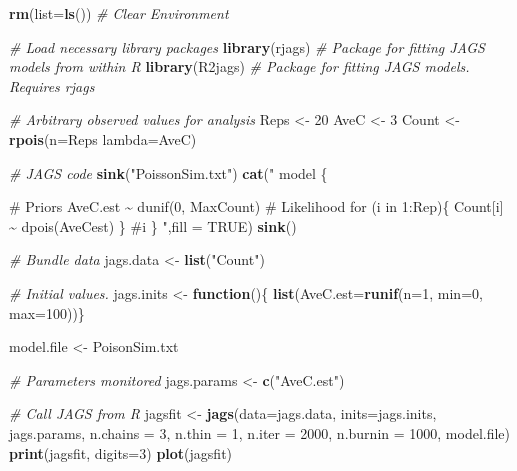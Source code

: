 \documentclass[
]{krantz}
\makeatletter
\newenvironment{Shaded}{\begin{snugshade}}{\end{snugshade}}
\newcommand{\AttributeTok}[1]{\textcolor[rgb]{0.27,0.27,0.27}{#1}}
\newcommand{\CommentTok}[1]{\textcolor[rgb]{0.37,0.37,0.37}{\textit{#1}}}
\newcommand{\ConstantTok}[1]{\textcolor[rgb]{0.37,0.37,0.37}{#1}}
\newcommand{\ControlFlowTok}[1]{\textcolor[rgb]{0.27,0.27,0.27}{\textbf{#1}}}
\newcommand{\DecValTok}[1]{\textcolor[rgb]{0.06,0.06,0.06}{#1}}
\newcommand{\FunctionTok}[1]{\textcolor[rgb]{0.27,0.27,0.27}{\textbf{#1}}}
\newcommand{\NormalTok}[1]{#1}
\newcommand{\OtherTok}[1]{\textcolor[rgb]{0.37,0.37,0.37}{#1}}
\newcommand{\StringTok}[1]{\textcolor[rgb]{0.5,0.5,0.5}{#1}}
\newenvironment{kframe}{%
\medskip{}
\setlength{\fboxsep}{.8em}
 \def\at@end@of@kframe{}%
 \ifinner\ifhmode%
  \def\at@end@of@kframe{\end{minipage}}%
  \begin{minipage}{\columnwidth}%
 \fi\fi%
 \def\FrameCommand##1{\hskip\@totalleftmargin \hskip-\fboxsep
 \colorbox{shadecolor}{##1}\hskip-\fboxsep
     \hskip-\linewidth \hskip-\@totalleftmargin \hskip\columnwidth}%
 \MakeFramed {\advance\hsize-\width
   \@totalleftmargin\z@ \linewidth\hsize
   \@setminipage}}%
 {\par\unskip\endMakeFramed%
 \at@end@of@kframe}
\renewenvironment{Shaded}{\begin{kframe}}{\end{kframe}}
\makeatother
\begin{document}
\begin{Shaded}
\begin{Highlighting}[]
\FunctionTok{rm}\NormalTok{(}\AttributeTok{list=}\FunctionTok{ls}\NormalTok{()) }\CommentTok{\# Clear Environment}

\CommentTok{\# Load necessary library packages}
\FunctionTok{library}\NormalTok{(rjags)   }\CommentTok{\# Package for fitting JAGS models from within R}
\FunctionTok{library}\NormalTok{(R2jags)  }\CommentTok{\# Package for fitting JAGS models. Requires rjags}

\CommentTok{\# Arbitrary \textquotesingle{}observed\textquotesingle{} values for analysis}
\NormalTok{Reps }\OtherTok{\textless{}{-}} \DecValTok{20}
\NormalTok{AveC }\OtherTok{\textless{}{-}} \DecValTok{3}
\NormalTok{Count }\OtherTok{\textless{}{-}} \FunctionTok{rpois}\NormalTok{(}\AttributeTok{n=}\NormalTok{Reps }\AttributeTok{lambda=}\NormalTok{AveC)}

\CommentTok{\# JAGS code}
\FunctionTok{sink}\NormalTok{(}\StringTok{"PoissonSim.txt"}\NormalTok{)}
\FunctionTok{cat}\NormalTok{(}\StringTok{"}
\StringTok{    model \{}

\StringTok{    \# Priors}
\StringTok{    AveC.est \textasciitilde{} dunif(0, MaxCount)}
\StringTok{   }
\StringTok{    \# Likelihood}
\StringTok{    for (i in 1:Rep)\{}
\StringTok{    Count[i] \textasciitilde{} dpois(AveCest)}
\StringTok{    \} \#i}
\StringTok{\}}
\StringTok{    "}\NormalTok{,}\AttributeTok{fill =} \ConstantTok{TRUE}\NormalTok{)}
\FunctionTok{sink}\NormalTok{()}

\CommentTok{\# Bundle data}
\NormalTok{jags.data }\OtherTok{\textless{}{-}} \FunctionTok{list}\NormalTok{(}\StringTok{"Count"}\NormalTok{)}

\CommentTok{\# Initial values.}
\NormalTok{jags.inits }\OtherTok{\textless{}{-}} \ControlFlowTok{function}\NormalTok{()\{ }\FunctionTok{list}\NormalTok{(}\AttributeTok{AveC.est=}\FunctionTok{runif}\NormalTok{(}\AttributeTok{n=}\DecValTok{1}\NormalTok{, }\AttributeTok{min=}\DecValTok{0}\NormalTok{, }\AttributeTok{max=}\DecValTok{100}\NormalTok{))\}}

\NormalTok{model.file }\OtherTok{\textless{}{-}} \StringTok{\textquotesingle{}PoisonSim.txt\textquotesingle{}}

\CommentTok{\# Parameters monitored}
\NormalTok{jags.params }\OtherTok{\textless{}{-}} \FunctionTok{c}\NormalTok{(}\StringTok{"AveC.est"}\NormalTok{)}

\CommentTok{\# Call JAGS from R}
\NormalTok{jagsfit }\OtherTok{\textless{}{-}} \FunctionTok{jags}\NormalTok{(}\AttributeTok{data=}\NormalTok{jags.data, }\AttributeTok{inits=}\NormalTok{jags.inits, jags.params,}
                \AttributeTok{n.chains =} \DecValTok{3}\NormalTok{, }\AttributeTok{n.thin =} \DecValTok{1}\NormalTok{, }\AttributeTok{n.iter =} \DecValTok{2000}\NormalTok{,}
                \AttributeTok{n.burnin =} \DecValTok{1000}\NormalTok{, model.file)}
\FunctionTok{print}\NormalTok{(jagsfit, }\AttributeTok{digits=}\DecValTok{3}\NormalTok{)}
\FunctionTok{plot}\NormalTok{(jagsfit)}
\end{Highlighting}
\end{Shaded}
\end{document}
